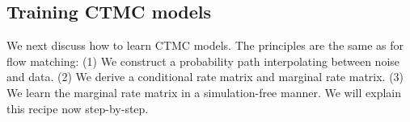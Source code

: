 

\subsection{Training CTMC models}
\label{subsec:ctmcs}

We next discuss how to learn CTMC models. The principles are the same as for flow matching: (1) We construct a probability path interpolating between noise and data. (2) We derive a conditional rate matrix and marginal rate matrix. (3) We learn the marginal rate matrix in a simulation-free manner. We will explain this recipe now step-by-step.

